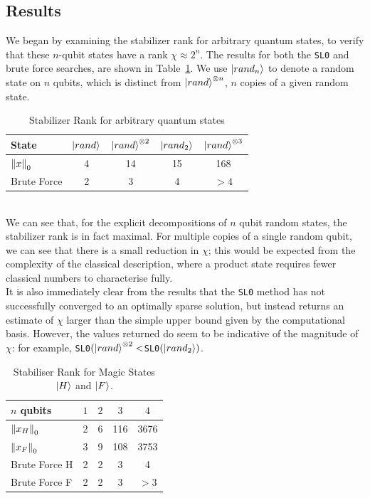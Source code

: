 \documentclass{standalone}
\begin{document}
\subsection{Results}
We began by examining the stabilizer rank for arbitrary quantum states, to verify that these $n$-qubit states have a rank $\chi\approx 2^{n}$. The results for both the \texttt{SL0} and brute force searches, are shown in Table~\ref{tab:arbitrary}. We use $\ket{rand_{n}}$ to denote a random state on $n$ qubits, which is distinct from $\ket{rand}^{\otimes n}$, $n$ copies of a given random state.
\begin{table}[!h]
\caption{Stabilizer Rank for arbitrary quantum states}\label{tab:arbitrary}
\centering
\begin{tabular}{||l|c|c|c|c||}
\hline
State & $\ket{rand}$ & $\ket{rand}^{\otimes 2}$ & $\ket{rand_{2}}$ &$\ket{rand}^{\otimes 3}$ \\ \hline
$\norm{x}_{0}$ & 4 & 14 & 15 & 168\\ \hline
Brute Force & 2 & 3  & 4 & $>4$\\ \hline
\end{tabular}
\end{table}\\
We can see that, for the explicit decompositions of $n$ qubit random states, the stabilizer rank is in fact maximal. For multiple copies of a single random qubit, we can see that there is a small reduction in $\chi$; this would be expected from the complexity of the classical description, where a product state requires fewer classical numbers to characterise fully.\\
It is also immediately clear from the results that the \texttt{SL0} method has not successfully converged to an optimally sparse solution, but instead returns an estimate of $\chi$ larger than the simple upper bound given by the computational basis. However, the values returned do seem to be indicative of the magnitude of $\chi$: for example, \texttt{SL0}$(\ket{rand}^{\otimes 2}<$\texttt{SL0}$(\ket{rand_{2}})$.
\par
\begin{table}[!h]
\centering
\caption{Stabiliser Rank for Magic States $\ket{H}$ and $\ket{F}$.}\label{tab:magic}
\begin{tabular}{||l|c|c|c|c||}
\hline
$n$ qubits & $1$ & $2$ & $3$ & $4$ \\ \hline
$\norm{x_{H}}_{0}$ & 2 & 6 & 116 & 3676\\ \hline
$\norm{x_{F}}_{0}$ & 3 & 9 & 108 & 3753\\ \hline
Brute Force H & 2 & 2  & 3 & 4\\ \hline
Brute Force F & 2 & 2  & 3 & $>3$ \\ \hline
\end{tabular}
\end{table}
\end{document}
